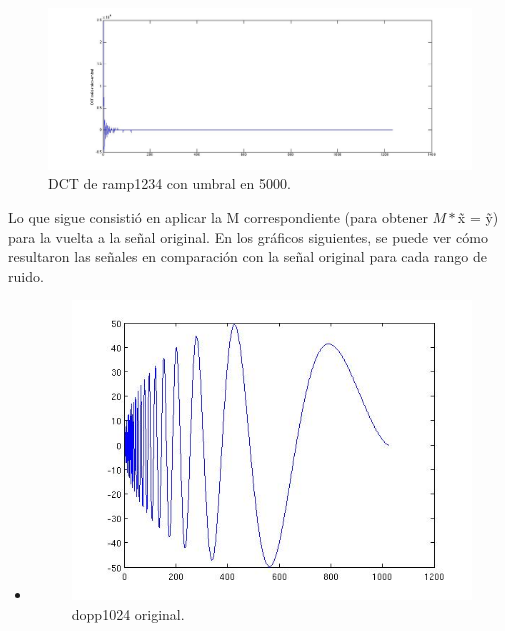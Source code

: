\documentclass[10pt, a4paper]{article}
\begin{document}
\begin{itemize}
\begin{figure}[H] %
\begin{center}
\includegraphics[width=500pt]{./umbral1_ramp1234.jpg}
\caption[h]{DCT de ramp1234 con umbral en 5000.}
\end{center}
\end{figure}

Lo que sigue consistió en aplicar la M correspondiente (para obtener $M*$\~x = \~y) para la vuelta a la señal original. En los gráficos siguientes, se puede ver cómo resultaron las señales en comparación con la señal original para cada rango de ruido.
\begin{itemize}

\item {}

\begin{figure}[H] %
\begin{center}
\includegraphics[width=300pt]{./dopp1024.jpg}
\caption[h]{dopp1024 original.}
\end{center}
\end{figure}


\end{itemize}
\end{itemize}
\end{document}
